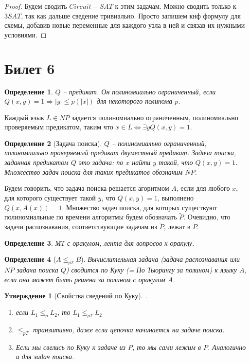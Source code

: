 \documentclass[12pt, letterpaper]{article}
\newtheorem{prop}{Утверждение}[section]
\newtheorem{defi}{Определение}[section]
\newcommand{\leqp}{\leq_{p}}
\begin{document}
\begin{proof}
Будем сводить $Circuit-SAT$ к этим задачам. Можно сводить только к $3SAT$, так как дальше сведение тривиально. Просто запишем кнф формулу для схемы, добавив новые переменные для каждого узла в ней и связав их нужными условиями.
\end{proof}

\section{Билет 6}
\begin{defi}
$Q$ -- предикат. Он полиномиально ограниченный, если $Q(x, y) = 1 \Rightarrow |y| \leq p(|x|)$ для некоторого полинома $p$.
\end{defi}
Каждый язык $L \in NP$ задается полиномиально ограниченным, полиномиально проверяемым предикатом, таким что $x \in L \Longleftrightarrow \exists y Q(x, y) = 1$.

\begin{defi}[Задача поиска]
$Q$ -- полиномиально ограниченный, полиномиально проверяемый предикат двуместный предикат. Задача поиска, заданная предикатом $Q$ это задача: по $x$ найти $y$ такой, что $Q(x,y)=1$. Множество задач поиска для таких предикатов обозначим $\widetilde{NP}$.
\end{defi}

Будем говорить, что задача поиска решается агоритмом $A$, если для любого $x$, для которого существует такой $y$, что $Q(x,y)=1$, выполнено $Q(x, A(x))=1$. Множество задач поиска, для которых существуют полиномиальные по времени алгоритмы будем обозначать $\widetilde{P}$. Очевидно, что задачи распознавания, соответствующие задачам из $\widetilde{P}$, лежат в $P$.

\begin{defi}
МТ с оракулом, лента для вопросов к оракулу.
\end{defi}

\begin{defi}[$A \leq_{pT} B$]
Вычислительная задача (задача распознавания или $NP$ задача поиска $Q$) сводится по Куку (= По Тьюрингу за полином) к языку $A$, если она может быть решена за полином с оракулом $A$.
\end{defi}

\begin{prop}[Свойства сведений по Куку].
\begin{enumerate} 
\item если $L_1 \leqp L_2$, то $L_1 \leq_{pT} L_2$
\item $\leq_{pT}$ транзитивно, даже если цепочка начинается на задаче поиска.
\item Если мы свелись по Куку к задаче из $P$, то мы сами лежим в $P$. Аналогично и для задач поиска.
\end{enumerate}
\end{prop}
\end{document}
